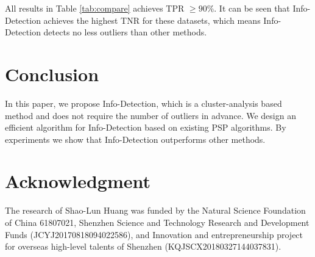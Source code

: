 \documentclass[runningheads]{llncs}
\begin{document}
All results in Table \ref{tab:compare} achieves TPR $\geq 90\%$. It can be seen that Info-Detection achieves the highest TNR for these datasets, which means Info-Detection detects no less outliers than other methods.

\section{Conclusion}\label{sec:Conclusion}
In this paper, we propose Info-Detection, which is a cluster-analysis based method and does not require the number of outliers in advance. We design an efficient algorithm for Info-Detection based on existing PSP algorithms. By experiments we show that Info-Detection outperforms other methods.  
\section*{Acknowledgment}

The research of Shao-Lun Huang was funded by the Natural Science Foundation of China 61807021, Shenzhen Science and Technology Research and Development Funds (JCYJ20170818094022586), and Innovation and entrepreneurship project for overseas high-level talents of Shenzhen (KQJSCX20180327144037831).
%
%
%


%
\end{document}
